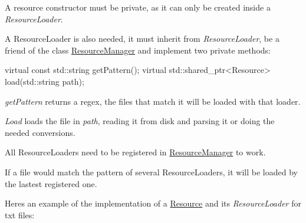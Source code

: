 A resource constructor must be private, as it can only be created inside a {\itshape Resource\+Loader}.

A Resource\+Loader is also needed, it must inherit from {\itshape Resource\+Loader}, be a friend of the class \hyperlink{classTarbora_1_1ResourceManager}{Resource\+Manager} and implement two private methods\+:


\begin{DoxyCode}
\textcolor{keyword}{virtual} \textcolor{keyword}{const} std::string getPattern();
\textcolor{keyword}{virtual} std::shared\_ptr<Resource> load(std::string path);
\end{DoxyCode}


{\itshape get\+Pattern} returns a regex, the files that match it will be loaded with that loader.

{\itshape Load} loads the file in {\itshape path}, reading it from disk and parsing it or doing the needed conversions.

All Resource\+Loaders need to be registered in \hyperlink{classTarbora_1_1ResourceManager}{Resource\+Manager} to work.

If a file would match the pattern of several Resource\+Loaders, it will be loaded by the lastest registered one.

Here\textquotesingle{}s an example of the implementation of a \hyperlink{classTarbora_1_1Resource}{Resource} and its {\itshape Resource\+Loader} for txt files\+:


